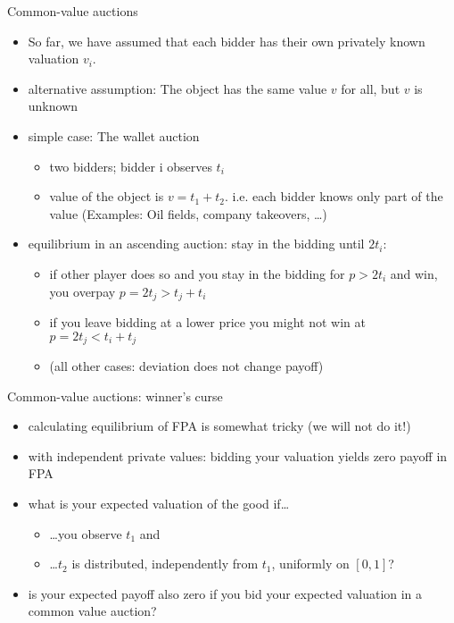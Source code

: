 \documentclass[bigger]{beamer}
\begin{document}
\begin{frame}[label={sec:org584aa1e}]{Common-value auctions}
\begin{itemize}
\item So far, we have assumed that each bidder has their own privately known valuation \(v_ i\).
\item alternative assumption: The object has the same value \(v\) for all, but \(v\) is unknown
\item simple case: The wallet auction
\begin{itemize}
\item two bidders; bidder i observes \(t_i\)
\item value of the object is \(v = t_1 + t_2\). i.e. each bidder knows only part of the value (Examples: Oil ﬁelds, company takeovers, \ldots{})
\end{itemize}
\item equilibrium in an ascending auction: \linebreak stay in the bidding until \(2t_i\):
\begin{itemize}
\item if other player does so and you stay in the bidding for \(p > 2t_i\) and win, you overpay \(p = 2t_j > t_j + t_i\)
\item if you leave bidding at a lower price you might not win at \(p= 2t_j < t_ i+t_j\)
\item (all other cases: deviation does not change payoff)
\end{itemize}
\end{itemize}
\end{frame}

\begin{frame}[label={sec:orgb518afa}]{Common-value auctions: winner's curse}
\begin{itemize}
\item calculating equilibrium of FPA is somewhat tricky (we will not do it!)
\item with independent private values: bidding your valuation yields zero payoff in FPA
\item what is your expected valuation of the good if\ldots{}
\begin{itemize}
\item \ldots{}you observe \(t_1\) and
\item \ldots{}\(t_2\) is distributed, independently from \(t_1\), uniformly on \([0,1]\)?
\pause
\end{itemize}
\item is your expected payoff also zero if you bid your expected valuation in a common value auction?
\end{itemize}
\end{frame}
\end{document}
